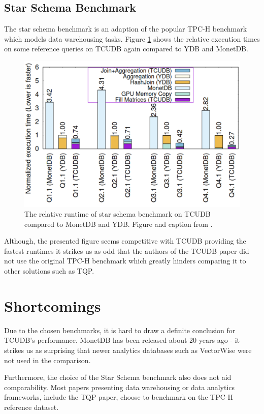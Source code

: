 \documentclass{paper}
\begin{document}
	\subsection{Star Schema Benchmark}
	The star schema benchmark \cite{o2009star} is an adaption of the popular TPC-H benchmark \cite{specification1993tpc} which models data \allowbreak warehousing tasks. Figure \ref{fig:bench4} shows the relative execution times on some reference queries on TCUDB again compared to YDB and MonetDB.
	\begin{figure}
		\centering
		\includegraphics[width=0.9\linewidth]{bench4}
		\caption{The relative runtime of star schema benchmark on TCUDB compared to MonetDB and YDB. Figure and caption from \cite{hu2021tcudb}.}
		\label{fig:bench4}
	\end{figure}
	Although, the presented figure seems competitive with TCUDB providing the fastest runtimes it strikes us as odd that the authors of the TCUDB paper did not use the original TPC-H benchmark \cite{specification1993tpc} which greatly hinders comparing it to other solutions such as TQP.
	
	
	\section{Shortcomings}
	
	Due to the chosen benchmarks, it is hard to draw a definite conclusion for TCUDB's performance. MonetDB has been released about 20 years ago - it strikes us as surprising that newer analytics databases such as VectorWise were not used in the comparison.
	
	Furthermore, the choice of the Star Schema benchmark also does not aid comparability. Most papers presenting data warehousing or data analytics frameworks, include the TQP paper, choose to benchmark on the TPC-H \cite{specification1993tpc} reference dataset.
	
\end{document}
